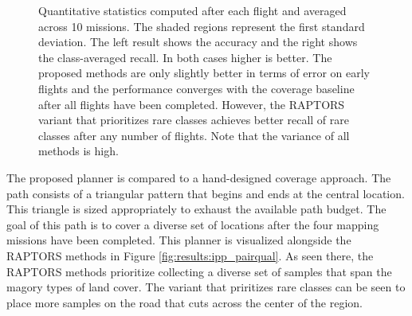 \begin{figure}
    \hfill
    \hfill
    \caption{Quantitative statistics computed after each flight and averaged across 10 missions. The shaded regions represent the first standard deviation. The left result shows the accuracy and the right shows the class-averaged recall. In both cases higher is better. The proposed methods are only slightly better in terms of error on early flights and the performance converges with the coverage baseline after all flights have been completed. However, the RAPTORS variant that prioritizes rare classes achieves better recall of rare classes after any number of flights. Note that the variance of all methods is high.}
    \label{fig:results:ipp_quant}
\end{figure}

The proposed planner is compared to a hand-designed coverage approach. The path consists of a triangular pattern that begins and ends at the central location. This triangle is sized appropriately to exhaust the available path budget. The goal of this path is to cover a diverse set of locations after the four mapping missions have been completed. This planner is visualized alongside the RAPTORS methods in Figure \ref{fig:results:ipp_pairqual}. As seen there, the RAPTORS methods prioritize collecting a diverse set of samples that span the magory types of land cover. The variant that priritizes rare classes can be seen to place more samples on the road that cuts across the center of the region.

